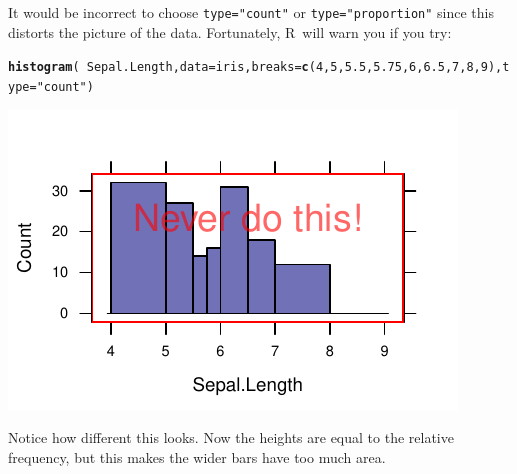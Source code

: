\documentclass[twoside]{book}\usepackage[]{graphicx}\usepackage[]{xcolor}
\makeatletter
\def\maxwidth{ %
  \ifdim\Gin@nat@width>\linewidth
    \linewidth
  \else
    \Gin@nat@width
  \fi
}
\newcommand{\hlnum}[1]{\textcolor[rgb]{0.686,0.059,0.569}{#1}}%
\newcommand{\hlstr}[1]{\textcolor[rgb]{0.192,0.494,0.8}{#1}}%
\newcommand{\hlopt}[1]{\textcolor[rgb]{0,0,0}{#1}}%
\newcommand{\hlstd}[1]{\textcolor[rgb]{0.345,0.345,0.345}{#1}}%
\newcommand{\hlkwc}[1]{\textcolor[rgb]{0.333,0.667,0.333}{#1}}%
\newcommand{\hlkwd}[1]{\textcolor[rgb]{0.737,0.353,0.396}{\textbf{#1}}}%
\newenvironment{kframe}{%
 \def\at@end@of@kframe{}%
 \ifinner\ifhmode%
  \def\at@end@of@kframe{\end{minipage}}%
  \begin{minipage}{\columnwidth}%
 \fi\fi%
 \def\FrameCommand##1{\hskip\@totalleftmargin \hskip-\fboxsep
 \colorbox{shadecolor}{##1}\hskip-\fboxsep
     \hskip-\linewidth \hskip-\@totalleftmargin \hskip\columnwidth}%
 \MakeFramed {\advance\hsize-\width
   \@totalleftmargin\z@ \linewidth\hsize
   \@setminipage}}%
 {\par\unskip\endMakeFramed%
 \at@end@of@kframe}
\newenvironment{knitrout}{}{} %
\newcommand{\option}[1]{{\color{brown!80!black}\texttt{#1}}}
\def\R{{\sf R}}
\makeatother
\begin{document}
It would be incorrect to choose \option{type="count"} or \option{type="proportion"} since
this distorts the picture of the data.  Fortunately, \R\ will warn you if you try:
\begin{knitrout}
\color{fgcolor}\begin{kframe}
\begin{alltt}
\hlkwd{histogram}\hlstd{(}\hlopt{~}\hlstd{Sepal.Length,} \hlkwc{data} \hlstd{= iris,} \hlkwc{breaks} \hlstd{=} \hlkwd{c}\hlstd{(}\hlnum{4}\hlstd{,} \hlnum{5}\hlstd{,} \hlnum{5.5}\hlstd{,} \hlnum{5.75}\hlstd{,} \hlnum{6}\hlstd{,} \hlnum{6.5}\hlstd{,} \hlnum{7}\hlstd{,} \hlnum{8}\hlstd{,} \hlnum{9}\hlstd{),} \hlkwc{type} \hlstd{=} \hlstr{"count"}\hlstd{)}
\end{alltt}
\end{kframe}
\end{knitrout}
\begin{knitrout}
\color{fgcolor}\begin{kframe}


{\ttfamily\noindent{}}\end{kframe}

{\centering \includegraphics[width=\maxwidth]{figures/fig-hist-unequal-bins-bad-1} 

}



\end{knitrout}

Notice how different this looks.  Now the heights are equal to the relative
frequency, but this makes the wider bars have too much area.
\end{document}
